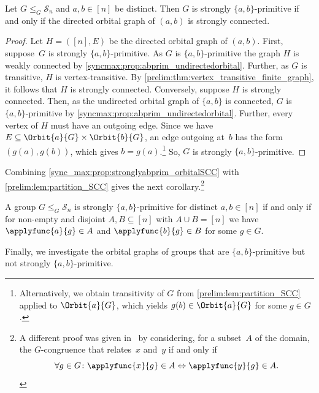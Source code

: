 \begin{proposition}
	\label{sync_max:prop:stronglyabprim_orbitalSCC}
	Let $G \le_G \mathcal S_n$ and $a,b \in [n]$ be distinct. 
	Then $G$ is strongly $\{a,b\}$-primitive if and only
	if the directed orbital graph of $(a,b)$
	is strongly connected.		
\end{proposition}
\begin{proof}  
	Let $H = ([n], E)$ be the directed orbital graph of $(a,b)$.
	First, suppose~$G$ is strongly $\{a,b\}$-primitive.
	As $G$ is $\{a,b\}$-primitive
	the graph $H$ is weakly connected by \cref{syncmax:prop:abprim_undirectedorbital}.
	Further, as $G$ is transitive, $H$
	is vertex-transitive. By \cref{prelim:thm:vertex_transitive_finite_graph},
	it follows that $H$ is strongly connected.
	Conversely, suppose $H$	is strongly connected.
	Then, as the undirected orbital graph of $\{a,b\}$
	is connected,
	$G$ is $\{a,b\}$-primitive by \cref{syncmax:prop:abprim_undirectedorbital}.
	Further, every vertex of $H$ must have an outgoing edge.
	Since we have $E \subseteq \Orbit{a}{G} \times \Orbit{b}{G}$,
	an edge outgoing at~$b$ has the form $(g(a), g(b))$,
	which gives $b = g(a)$.\footnote{Alternatively, 
		we obtain transitivity of $G$
		from \cref{prelim:lem:partition_SCC}
		applied to $\Orbit{a}{G}$,
		which yields  $g(b) \in \Orbit{a}{G}$
		for some $g \in G$.}
	So, $G$ is strongly $\{a,b\}$-primitive.		
\end{proof}

Combining \cref{sync_max:prop:stronglyabprim_orbitalSCC}
with \cref{prelim:lem:partition_SCC} gives the next corollary.\footnote{A different
	proof was given in~\cite[Prop.~2.2]{HoffmannLATAextended2}
	by considering, for a subset~$A$ of the domain, the $G$-congruence
	that relates~$x$ and~$y$ if and only if
	\[
	\forall g \in G \colon \applyfunc{x}{g} \in A \Leftrightarrow \applyfunc{y}{g} \in A.
	\]
}

\begin{corollary}\label{sync_max:cor:stronglyabprim_AB}	
	A group $G \le_G \mathcal S_n$ 
	is strongly $\{a,b\}$-primitive for distinct $a,b \in [n]$ if and only if
	for non-empty and disjoint
	$A, B \subseteq [n]$ with $A \cup B = [n]$
	we have $\applyfunc{a}{g} \in A$
	and $\applyfunc{b}{g} \in B$
	for some $g \in G$.
\end{corollary}

Finally, we investigate the orbital graphs of groups that are $\{a,b\}$-primitive but not strongly $\{a,b\}$-primitive.

